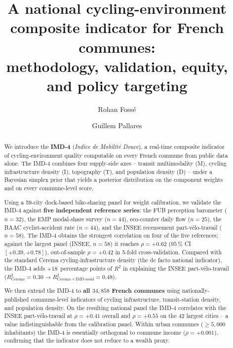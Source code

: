 \documentclass[11pt,a4paper]{article}
\title{\Large\bfseries A national cycling-environment composite indicator
for French communes:\\
\large methodology, validation, equity, and policy targeting}
\author[1]{Rohan Foss\'e}
\author[1]{Guillem Pallares}
\affil[1]{CESI LINEACT, 8 boulevard Louis Schuller, 76420 Saint-Etienne-du-Rouvray, France}
\date{}
\newcommand{\IMD}{\mathrm{IMD}}
\begin{document}
\maketitle

\begin{abstract}
\noindent
We introduce the \textbf{IMD-4} (\emph{Indice de Mobilit\'e Douce}), a
real-time composite indicator of cycling-environment quality computable
on every French commune from public data alone.  The IMD-4 combines
four supply-side axes -- transit multimodality (M), cycling infrastructure
density (I), topography (T), and population density (D) -- under a
Bayesian simplex prior that yields a posterior distribution on the
component weights and on every commune-level score.

Using a 59-city dock-based bike-sharing panel for weight calibration,
we validate the IMD-4 against \textbf{five independent reference series}:
the FUB perception barometer ($n=32$), the EMP modal-share survey
($n=44$), eco-counter daily flow ($n=25$), the BAAC cyclist-accident
rate ($n=44$), and the INSEE recensement part-v\'elo-travail ($n=58$).
The IMD-4 obtains the strongest correlation on four of the five
references; against the largest panel (INSEE, $n=58$) it reaches
$\rho = +0.62$ ($95\,\%$ CI $[+0.39, +0.78]$), out-of-sample
$\rho = +0.42$ in 5-fold cross-validation.  Compared with the standard
Cerema cycling-infrastructure density (the de facto national
indicator), the IMD-4 adds $+18\,$ percentage points of $R^2$ in
explaining the INSEE part-v\'elo-travail
($R^2_{\text{Cerema}} = 0.30 \to R^2_{\text{Cerema} + \IMD\text{-resid}} = 0.48$).

We then extend the IMD-4 to \textbf{all $34{,}858$ French communes}
using nationally-published commune-level indicators of cycling
infrastructure, transit-station density, and population density.
On the resulting national panel the IMD-4 correlates with the
INSEE part-v\'elo-travail at $\rho = +0.41$ overall and $\rho = +0.55$
on the 42 largest cities -- a value indistinguishable from the
calibration panel.  Within urban communes ($\geq 5{,}000$
inhabitants) the IMD-4 is essentially orthogonal to commune income
($\rho = +0.001$), confirming that the indicator does not reduce to a
wealth proxy.


\end{abstract}
\end{document}
